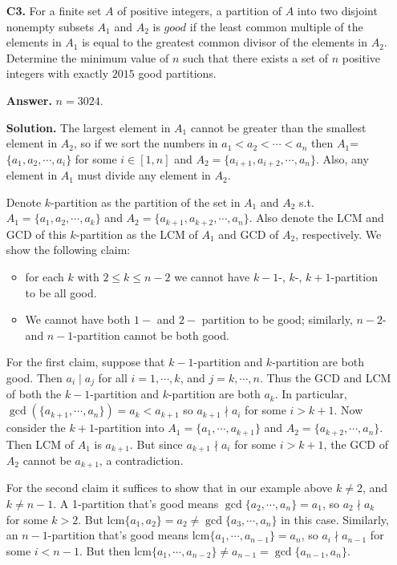 \documentclass[11pt,a4paper]{article}
\begin{document}
\begin{enumerate}
\item[\textbf{C3.}] For a finite set $A$ of positive integers, a partition of $A$ into two disjoint nonempty subsets $A_1$ and $A_2$ is $\textit{good}$ if the least common multiple of the elements in $A_1$ is equal to the greatest common divisor of the elements in $A_2$. Determine the minimum value of $n$ such that there exists a set of $n$ positive integers with exactly $2015$ good partitions.

\textbf{Answer.} $n=3024$. 

\textbf{Solution.} The largest element in $A_1$ cannot be greater than the smallest element in $A_2$, so if we sort the numbers in $a_1<a_2<\cdots <a_n$ then $A_1$=$\{a_1,a_2,\cdots , a_i\}$ for some $i\in[1,n]$ and $A_2=\{a_{i+1}, a_{i+2},\cdots , a_n\}$. Also, any element in $A_1$ must divide any element in $A_2$. 

Denote $k$-partition as the partition of the set in $A_1$ and $A_2$ s.t. $A_1=\{a_1,a_2,\cdots , a_k\}$ and $A_2=\{a_{k+1}, a_{k+2},\cdots , a_n\}$. Also denote the LCM and GCD of this $k$-partition as the LCM of $A_1$ and GCD of $A_2$, respectively. 
We show the following claim: 
\begin{itemize}
	\item for each $k$ with $2\le k\le n-2$ we cannot have $k-1$-, $k$-, $k+1$-partition to be all good. 
	
	\item We cannot have both $1-$ and $2-$ partition to be good; similarly, $n-2$- and $n-1$-partition cannot be both good. 
\end{itemize}
For the first claim, suppose that $k-1$-partition and $k$-partition are both good. 
Then $a_i\mid a_j$ for all $i=1, \cdots, k$, and $j = k, \cdots, n$. 
Thus the GCD and LCM of both the $k-1$-partition and $k$-partition are both $a_k$. 
In particular, $\gcd(\{a_{k+1}, \cdots, a_n\}) = a_k < a_{k + 1}$ so $a_{k+1}\nmid a_i$ for some $i > k + 1$. 
Now consider the $k+1$-partition into $A_1=\{a_1, \cdots, a_{k+1}\}$ and $A_2 = \{a_{k+2}, \cdots, a_n\}$. 
Then LCM of $A_1$ is $a_{k+1}$. 
But since $a_{k+1}\nmid a_i$ for some $i > k + 1$, 
the GCD of $A_2$ cannot be $a_{k+1}$, a contradiction. 

For the second claim it suffices to show that in our example above $k\neq 2$, and $k\neq n - 1$. 
A 1-partition that's good means $\gcd\{a_2, \cdots, a_n\}=a_1$, so $a_2\nmid a_k$ for some $k > 2$. 
But $\text{lcm}\{a_1, a_2\} = a_2 \neq \gcd\{a_3, \cdots, a_n\}$ in this case. 
Similarly, an $n-1$-partition that's good means $\text{lcm}\{a_1, \cdots , a_{n-1}\} = a_n$, 
so $a_i\nmid a_{n-1}$ for some $i < n - 1$. 
But then $\text{lcm} \{a_1, \cdots , a_{n-2}\}\neq a_{n-1} = \gcd\{a_{n-1}, a_n\}$. 


\end{enumerate}
\end{document}
